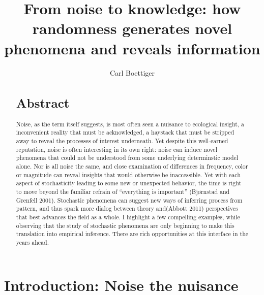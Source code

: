 \documentclass[3p]{elsarticle} %
\begin{document}
\begin{frontmatter}

  \title{From noise to knowledge: how randomness generates novel phenomena and
reveals information}
    \author[a]{Carl Boettiger}
  
      \address[a]{Dept of Environmental Science, Policy, and Management, University of
California Berkeley, Berkeley CA 94720-3114, USA}
  
  \begin{abstract}
  \hypertarget{abstract}{%
  \section{Abstract}\label{abstract}}
  
  Noise, as the term itself suggests, is most often seen a nuisance to
  ecological insight, a inconvenient reality that must be acknowledged, a
  haystack that must be stripped away to reveal the processes of interest
  underneath. Yet despite this well-earned reputation, noise is often
  interesting in its own right: noise can induce novel phenomena that
  could not be understood from some underlying determinstic model alone.
  Nor is all noise the same, and close examination of differences in
  frequency, color or magnitude can reveal insights that would otherwise
  be inaccessible. Yet with each aspect of stochasticity leading to some
  new or unexpected behavior, the time is right to move beyond the
  familiar refrain of ``everything is important'' (Bjørnstad and Grenfell
  2001). Stochastic phenomena can suggest new ways of inferring process
  from pattern, and thus spark more dialog between theory and(Abbott 2011)
  perspectives that best advances the field as a whole. I highlight a few
  compelling examples, while observing that the study of stochastic
  phenomena are only beginning to make this translation into empirical
  inference. There are rich opportunities at this interface in the years
  ahead.\\
  \end{abstract}
  
 \end{frontmatter}

\newpage

\hypertarget{introduction-noise-the-nuisance}{%
\section{Introduction: Noise the
nuisance}\label{introduction-noise-the-nuisance}}
\end{document}

